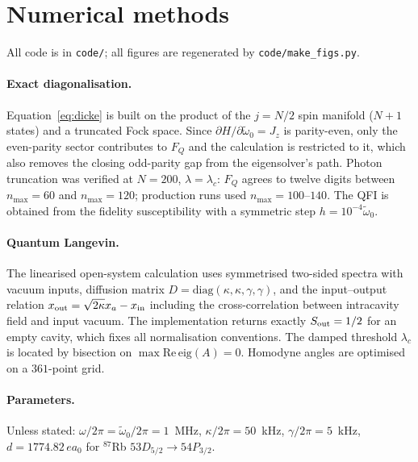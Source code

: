 \documentclass[11pt,a4paper]{article}
\newcommand{\wt}{\tilde{\omega}_{0}}
\newcommand{\lc}{\lambda_{c}}
\begin{document}
\appendix

\section{Numerical methods}
\label{app:methods}

All code is in \texttt{code/}; all figures are regenerated by \texttt{code/make\_figs.py}.

\paragraph{Exact diagonalisation.} Equation~\eqref{eq:dicke} is built on the product of the
$j=N/2$ spin manifold ($N+1$ states) and a truncated Fock space. Since
$\partial H/\partial\wt = J_z$ is parity-even, only the even-parity sector contributes to
$F_Q$ and the calculation is restricted to it, which also removes the closing odd-parity gap
from the eigensolver's path. Photon truncation was verified at $N=200$, $\lambda=\lc$:
$F_Q$ agrees to twelve digits between $n_{\max}=60$ and $n_{\max}=120$; production runs used
$n_{\max}=100$--$140$. The QFI is obtained from the fidelity susceptibility with a symmetric
step $h = 10^{-4}\wt$.

\paragraph{Quantum Langevin.} The linearised open-system calculation uses symmetrised
two-sided spectra with vacuum inputs, diffusion matrix $D=\mathrm{diag}(\kappa,\kappa,
\gamma,\gamma)$, and the input--output relation $x_{\rm out}=\sqrt{2\kappa}x_a - x_{\rm in}$
including the cross-correlation between intracavity field and input vacuum. The
implementation returns exactly $S_{\rm out}=1/2$ for an empty cavity, which fixes all
normalisation conventions. The damped threshold $\lc$ is located by bisection on
$\max\mathrm{Re}\,\mathrm{eig}(A)=0$. Homodyne angles are optimised on a $361$-point grid.

\paragraph{Parameters.} Unless stated: $\omega/2\pi=\wt/2\pi=1$~MHz, $\kappa/2\pi=50$~kHz,
$\gamma/2\pi=5$~kHz, $d=1774.82\,ea_0$ for $^{87}$Rb $53D_{5/2}\!\to\!54P_{3/2}$.
\end{document}
